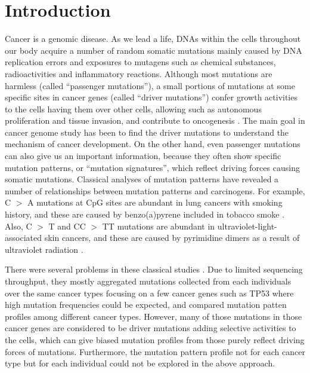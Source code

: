 \section*{Introduction}

Cancer is a genomic disease. 
As we lead a life, DNAs within the cells throughout our body acquire a number of random somatic mutations
mainly caused by DNA replication errors and exposures to mutagens such as chemical substances, radioactivities and inflammatory reactions.  
Although most mutations are harmless (called ``passenger mutations''), 
a small portions of mutations at some specific sites in cancer genes (called ``driver mutations'') 
confer growth activities to the cells having them over other cells,
allowing such as autonomous proliferation and tissue invasion,
and contribute to oncogenesis \cite{stratton2009cancer}.
The main goal in cancer genome study has been to find the driver mutations to understand the mechanism of cancer development.
On the other hand,  even passenger mutations can also give us an important information, 
because they often show specific mutation patterns, or ``mutation signatures'', which reflect driving forces causing somatic mutations.
Classical analyses of mutation patterns have revealed a number of relationships between mutation patterns and carcinogens.
For example, C $>$ A mutations at CpG sites are abundant in lung cancers with smoking history,
and these are caused by benzo(a)pyrene included in tobacco smoke \cite{pmid12379884}.
Also, C $>$ T and CC $>$ TT  mutations are abundant in ultraviolet-light-associated skin cancers, 
and these are caused by pyrimidine dimers as a result of ultraviolet radiation \cite{pmid15748635}. 

There were several problems in these classical studies \cite{pmid12379884, pmid15748635}.
Due to limited sequencing throughput, 
they mostly aggregated mutations collected from each individuals over the same cancer types focusing on a few cancer genes such as TP53
where high mutation frequencies could be expected,
and compared mutation patten profiles among different cancer types.
However, many of those mutations in those cancer genes are considered to be driver mutations adding selective activities to the cells,
which can give biased mutation profiles from those purely reflect driving forces of mutations.
Furthermore, the mutation pattern profile not for each cancer type but for each individual could not be explored in the above approach.

